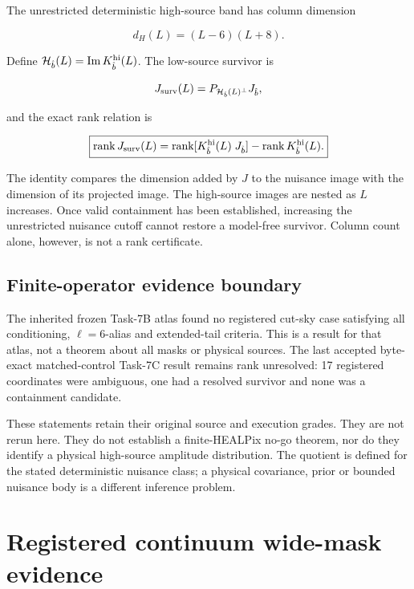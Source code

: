 \documentclass[
  11pt,
  a4paper]{article}
\begin{document}
The unrestricted deterministic high-source band has column dimension

\[
d_H(L)=(L-6)(L+8).
\]

Define \(\mathcal H_{\hat b}(L)=\operatorname{Im}K_{\hat b}^{\rm hi}(L)\). The low-source survivor is

\[
J_{\rm surv}(L)=P_{\mathcal H_{\hat b}(L)^\perp}J_{\hat b},
\]

and the exact rank relation is

\[
\boxed{
\operatorname{rank}J_{\rm surv}(L)
=\operatorname{rank}[K_{\hat b}^{\rm hi}(L)\;J_{\hat b}]
-\operatorname{rank}K_{\hat b}^{\rm hi}(L).
}
\]

The identity compares the dimension added by \(J\) to the nuisance image with the dimension of its projected image. The high-source images are nested as \(L\) increases. Once valid containment has been established, increasing the unrestricted nuisance cutoff cannot restore a model-free survivor. Column count alone, however, is not a rank certificate.

\hypertarget{finite-operator-evidence-boundary}{%
\subsection{Finite-operator evidence boundary}\label{finite-operator-evidence-boundary}}

The inherited frozen Task-7B atlas found no registered cut-sky case satisfying all conditioning, \(\ell=6\)-alias and extended-tail criteria. This is a result for that atlas, not a theorem about all masks or physical sources. The last accepted byte-exact matched-control Task-7C result remains rank unresolved: 17 registered coordinates were ambiguous, one had a resolved survivor and none was a containment candidate.

These statements retain their original source and execution grades. They are not rerun here. They do not establish a finite-HEALPix no-go theorem, nor do they identify a physical high-source amplitude distribution. The quotient is defined for the stated deterministic nuisance class; a physical covariance, prior or bounded nuisance body is a different inference problem.

\hypertarget{registered-continuum-wide-mask-evidence}{%
\section{Registered continuum wide-mask evidence}\label{registered-continuum-wide-mask-evidence}}
\end{document}
